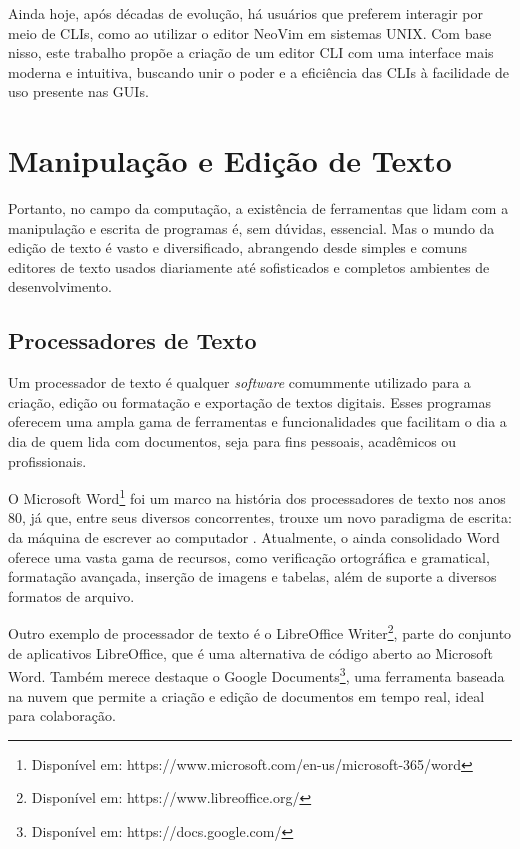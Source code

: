 Ainda hoje, após décadas de evolução, há usuários que preferem interagir por meio
de CLIs, como ao utilizar o editor NeoVim em sistemas UNIX. Com base nisso, este
trabalho propõe a criação de um editor CLI com uma interface mais moderna e
intuitiva, buscando unir o poder e a eficiência das CLIs à facilidade de uso presente
nas GUIs.

\section{Manipulação e Edição de Texto}

Portanto, no campo da computação, a existência de ferramentas que lidam com a
manipulação e escrita de programas é, sem dúvidas, essencial. Mas o mundo da edição
de texto é vasto e diversificado, abrangendo desde simples e comuns editores de
texto usados diariamente até sofisticados e completos ambientes de
desenvolvimento.

\subsection{Processadores de Texto}

Um processador de texto é qualquer \textit{software} comummente utilizado para a
criação, edição ou formatação e exportação de textos digitais. Esses programas
oferecem uma ampla gama de ferramentas e funcionalidades que facilitam o dia a
dia de quem lida com documentos, seja para fins pessoais, acadêmicos ou
profissionais.

O Microsoft Word\footnote{Disponível em: https://www.microsoft.com/en-us/microsoft-365/word}
foi um marco na história dos processadores de texto nos anos 80, já que, entre seus
diversos concorrentes, trouxe um novo paradigma de escrita: da máquina de escrever
ao computador \cite{inbook}. Atualmente, o ainda consolidado Word oferece uma vasta
gama de recursos, como verificação ortográfica e gramatical, formatação avançada,
inserção de imagens e tabelas, além de suporte a diversos formatos de arquivo.

Outro exemplo de processador de texto é o LibreOffice Writer\footnote{Disponível
em: https://www.libreoffice.org/}, parte do conjunto de aplicativos LibreOffice,
que é uma alternativa de código aberto ao Microsoft Word. Também merece destaque
o Google Documents\footnote{Disponível em: https://docs.google.com/}, uma ferramenta
baseada na nuvem que permite a criação e edição de documentos em tempo real,
ideal para colaboração.

